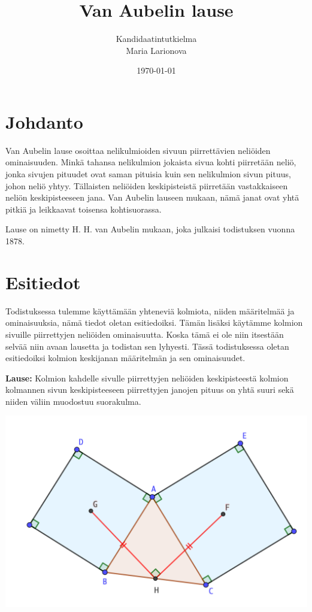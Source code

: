 \documentclass{scrartcl}
\title{Van Aubelin lause}
\author{Kandidaatintutkielma\\Maria Larionova}
\date{\today}
\begin{document}
\maketitle
\pagebreak
\tableofcontents
\pagebreak


\section{Johdanto}
Van Aubelin lause osoittaa nelikulmioiden sivuun piirrettävien neliöiden ominaisuuden. Minkä tahansa nelikulmion jokaista sivua kohti piirretään neliö, jonka sivujen pituudet ovat saman pituisia kuin sen nelikulmion sivun pituus, johon neliö yhtyy. Tällaisten neliöiden keskipisteistä piirretään vastakkaiseen neliön keskipisteeseen jana. Van Aubelin lauseen mukaan, nämä janat ovat yhtä pitkiä ja leikkaavat toisensa kohtisuorassa. 

Lause on nimetty H. H. van Aubelin mukaan, joka julkaisi todistuksen vuonna 1878.

\pagebreak
\section{Esitiedot}
Todistuksessa tulemme käyttämään yhteneviä kolmiota, niiden määritelmää ja ominaisuuksia, nämä tiedot oletan esitiedoiksi. Tämän lisäksi käytämme kolmion sivuille piirrettyjen neliöiden ominaisuutta. Koska tämä ei ole niin itsestään selvää niin avaan lausetta ja todistan sen lyhyesti. Tässä todistuksessa oletan esitiedoiksi kolmion keskijanan määritelmän ja sen ominaisuudet.

\textbf{Lause:} Kolmion kahdelle sivulle piirrettyjen neliöiden keskipisteestä kolmion kolmannen sivun keskipisteeseen piirrettyjen janojen pituus on yhtä suuri sekä niiden väliin muodostuu suorakulma.
\begin{center}
    \includegraphics[scale=0.6]{kolmiotodistus.png}
\end{center}
\end{document}
